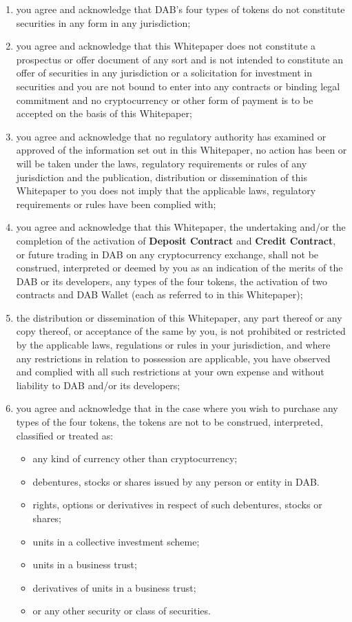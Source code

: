 \documentclass[review]{elsarticle}
\begin{document}
\begin{enumerate}
   \item you agree and acknowledge that DAB's four types of tokens do not constitute securities in any form in any jurisdiction;
   \item you agree and acknowledge that this Whitepaper does not constitute a prospectus or offer document of any sort and is not intended to constitute an offer of securities in any jurisdiction or a solicitation for investment in securities and you are not bound to enter into any contracts or binding legal commitment and no cryptocurrency or other form of payment is to be accepted on the basis of this Whitepaper;
   \item you agree and acknowledge that no regulatory authority has examined or approved of the information set out in this Whitepaper, no action has been or will be taken under the laws, regulatory requirements or rules of any jurisdiction and the publication, distribution or dissemination of this Whitepaper to you does not imply that the applicable laws, regulatory requirements or rules have been complied with;
   \item you agree and acknowledge that this Whitepaper, the undertaking and/or the completion of the activation of \textbf{Deposit Contract} and \textbf{Credit Contract}, or future trading in DAB on any cryptocurrency exchange, shall not be construed, interpreted or deemed by you as an indication of the merits of the DAB or its developers, any types of the four tokens, the activation of two contracts and DAB Wallet (each as referred to in this Whitepaper);
   \item the distribution or dissemination of this Whitepaper, any part thereof or any copy thereof, or acceptance of the same by you, is not prohibited or restricted by the applicable laws, regulations or rules in your jurisdiction, and where any restrictions in relation to possession are applicable, you have observed and complied with all such restrictions at your own expense and without liability to DAB and/or its developers;
   \item you agree and acknowledge that in the case where you wish to purchase any types of the four tokens, the tokens are not to be construed, interpreted, classified or treated as:
\begin{itemize}
   \item any kind of currency other than cryptocurrency;
   \item debentures, stocks or shares issued by any person or entity in DAB.
   \item rights, options or derivatives in respect of such debentures, stocks or shares;
   \item units in a collective investment scheme;
   \item units in a business trust;
   \item derivatives of units in a business trust;
   \item or any other security or class of securities.
\end{itemize}


\end{enumerate}
\end{document}
